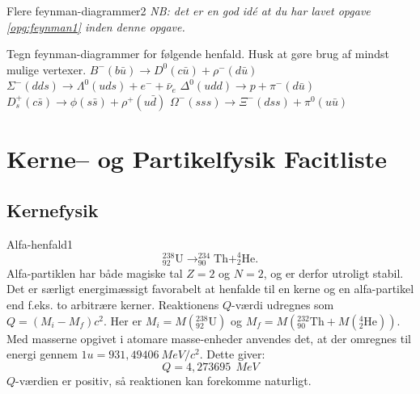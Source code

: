 \begin{opgave}{Flere feynman-diagrammer}{2}
\emph{NB: det er en god idé at du har lavet opgave \ref{opg:feynman1} inden denne opgave.}

Tegn feynman-diagrammer for følgende henfald. Husk at gøre brug af mindst mulige vertexer.
\opg $B^- (b\bar{u}) \longrightarrow D^0(c\bar{u}) + \rho^-(d\bar{u})$
\opg $\Sigma^-(dds) \longrightarrow \Lambda^0 (uds) + e^- + \bar{\nu}_e$
\opg $\Delta^0 (udd) \longrightarrow p + \pi^- (d\bar{u})$
\opg $D_s^+ (c\bar{s}) \longrightarrow \phi (s\bar{s}) + \rho^+ (u\bar{d})$
\opg $\Omega^-(sss) \longrightarrow \Xi^-(dss) + \pi^0(u\bar{u})$
\end{opgave}

\chapter{Kerne-- og Partikelfysik Facitliste}
\section*{Kernefysik}
\begin{opgave}{Alfa-henfald}{1}
\begin{equation*}
^{238}_{92} \text{U} \rightarrow ^{234}_{90}\text{Th} + ^{4}_{2}\text{He}.
\end{equation*}
\opg Alfa-partiklen har både magiske tal $Z=2$ og $N=2$, og er derfor utroligt stabil. Det er særligt energimæssigt favorabelt at henfalde til en kerne og en alfa-partikel end f.eks. to arbitrære kerner.
\opg Reaktionens $Q$-værdi udregnes som $Q=(M_i - M_f)c^2$. Her er $M_i=M(^{238}_{92} \text{U})$ og $M_f=M(^{232}_{90}\text{Th}+M(^{4}_{2}\text{He}))$. Med masserne opgivet i atomare masse-enheder anvendes det, at der omregnes til energi gennem $1 u = 931,49406\SI{}{MeV/c^2}$. Dette giver:
\begin{equation*}
Q = 4,273695~\SI{}{MeV}
\end{equation*}
$Q$-værdien er positiv, så reaktionen kan forekomme naturligt.
\end{opgave}

